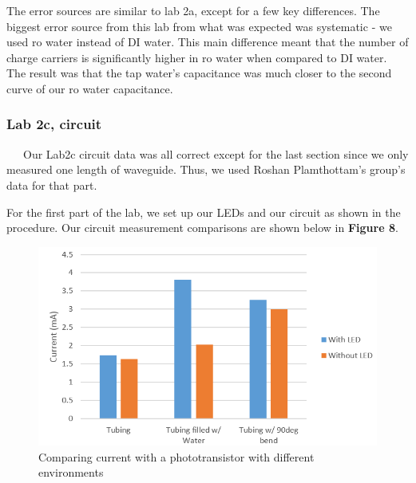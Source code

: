 \documentclass{article}
\begin{document}
The error sources are similar to lab 2a, except for a few key differences. The biggest error source from this lab from what was expected was systematic - we used ro water instead of DI water. This main difference meant that the number of charge carriers is significantly higher in ro water when compared to DI water. The result was that the tap water's capacitance was much closer to the second curve of our ro water capacitance.

\subsubsection*{Lab 2c, circuit}
\ \ \ Our Lab2c circuit data was all correct except for the last section since we only measured one length of waveguide. Thus, we used Roshan Plamthottam's group's data for that part.

For the first part of the lab, we set up our LEDs and our circuit as shown in the procedure. Our circuit measurement comparisons are shown below in \textbf{Figure 8}.

\begin{figure}[h!]
	\centering
	\includegraphics[scale=0.77]{bar.png}
	\caption{Comparing current with a phototransistor with different environments}
\end{figure}
\end{document}
